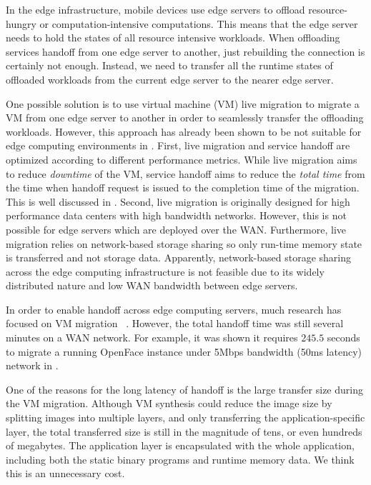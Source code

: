 %
In the edge infrastructure, mobile devices use edge servers to offload resource-hungry or computation-intensive computations. This means that the edge server needs to hold the states of all resource intensive workloads. 
When offloading services handoff from one edge server to another, just rebuilding the connection is certainly not enough. Instead, we need to transfer all the runtime states of offloaded workloads from the current edge server to the nearer edge server.  

One possible solution is 
to use virtual machine (VM) live migration \cite{vmlivemig} 
to migrate a VM from one edge server to another in order to seamlessly transfer the offloading workloads. However, this approach has already been shown to be not suitable for edge computing environments in \cite{ha2015vmhandoff}. 
First, live migration and service handoff are optimized according to different performance metrics. While live migration aims to reduce \textit{downtime} of the VM, service handoff aims to reduce the \textit{total time} from the time when handoff request is issued to the completion time of the migration. This is well discussed in \cite{ha2015vmhandoff}.
Second, live migration is originally designed for high performance data centers with high bandwidth networks. However, this is not possible for edge servers which are deployed over the WAN. Furthermore, live migration relies on network-based storage sharing so only run-time memory state is transferred and not storage data. Apparently, network-based storage sharing across the edge computing infrastructure is not feasible due to its widely distributed nature and low WAN bandwidth between edge servers. 

In order to enable handoff across edge computing servers, much research has focused on VM migration ~\cite{satya2009case,ha2015vmhandoff}. 
However, the total handoff time was still several minutes on a WAN network. For example, it was shown it requires $245.5$ seconds to migrate a running OpenFace instance under 5Mbps bandwidth (50ms latency) network in \cite{ha2015vmhandoff}. 

One of the reasons for the long latency of handoff is the large transfer size during the VM migration. Although VM synthesis could reduce the image size by splitting images into multiple layers, and only transferring the application-specific layer, the total transferred size is still in the magnitude of tens, or even hundreds of megabytes. 
The application layer is encapsulated with the whole application, including both the static binary programs and runtime memory data. We think this is an unnecessary cost. 

